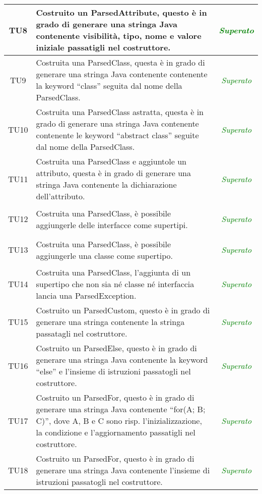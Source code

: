 \begin{longtable}{|c|>{}m{8cm}|c|}
\hypertarget{TU8}{TU8} & Costruito un ParsedAttribute, questo è in grado di generare una stringa Java contenente visibilità, tipo, nome e valore iniziale passatigli nel costruttore. & \textcolor{Green}{\textit{Superato}}\\ \hline
\hypertarget{TU9}{TU9} & Costruita una ParsedClass, questa è in grado di generare una stringa Java contenente contenente la keyword ``class'' seguita dal nome della ParsedClass. & \textcolor{Green}{\textit{Superato}}\\ \hline
\hypertarget{TU10}{TU10} & Costruita una ParsedClass astratta, questa è in grado di generare una stringa Java contenente contenente le keyword ``abstract class'' seguite dal nome della ParsedClass. & \textcolor{Green}{\textit{Superato}}\\ \hline
\hypertarget{TU11}{TU11} & Costruita una ParsedClass e aggiuntole un attributo, questa è in grado di generare una stringa Java contenente la dichiarazione dell'attributo. & \textcolor{Green}{\textit{Superato}}\\ \hline
\hypertarget{TU12}{TU12} & Costruita una ParsedClass, è possibile aggiungerle delle interfacce come supertipi. & \textcolor{Green}{\textit{Superato}}\\ \hline
\hypertarget{TU13}{TU13} & Costruita una ParsedClass, è possibile aggiungerle una classe come supertipo. & \textcolor{Green}{\textit{Superato}}\\ \hline
\hypertarget{TU14}{TU14} & Costruita una ParsedClass, l'aggiunta di un supertipo che non sia né classe né interfaccia lancia una ParsedException. & \textcolor{Green}{\textit{Superato}}\\ \hline
\hypertarget{TU15}{TU15} & Costruito un ParsedCustom, questo è in grado di generare una stringa contenente la stringa passatagli nel costruttore. & \textcolor{Green}{\textit{Superato}}\\ \hline
\hypertarget{TU16}{TU16} & Costruito un ParsedElse, questo è in grado di generare una stringa Java contenente la keyword ``else'' e l'insieme di istruzioni passatogli nel costruttore. & \textcolor{Green}{\textit{Superato}}\\ \hline
\hypertarget{TU17}{TU17} & Costruito un ParsedFor, questo è in grado di generare una stringa Java contenente ``for(A; B; C)'', dove A, B e C sono risp. l'inizializzazione, la condizione e l'aggiornamento passatigli nel costruttore. & \textcolor{Green}{\textit{Superato}}\\ \hline
\hypertarget{TU18}{TU18} & Costruito un ParsedFor, questo è in grado di generare una stringa Java contenente l'insieme di istruzioni passatogli nel costruttore. & \textcolor{Green}{\textit{Superato}}\\ \hline

\end{longtable}
